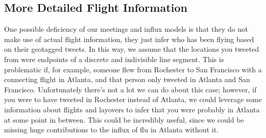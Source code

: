 \documentclass[11pt, letterpaper]{article}
\begin{document}
        \subsection{More Detailed Flight Information}
            One possible deficiency of our meetings and influx models is that they do not make use of actual flight information, they just infer who has been flying based on their geotagged tweets. In this way, we assume that the locations you tweeted from were endpoints of a discrete and indivisible line segment. This is problematic if, for example, someone flew from Rochester to San Francisco with a connecting flight in Atlanta, and that person only tweeted in Atlanta and San Francisco. Unfortunately there's not a lot we can do about this case; however, if you were to have tweeted in Rochester instead of Atlanta, we could leverage some information about flights and layovers to infer that you were probably in Atlanta at some point in between. This could be incredibly useful, since we could be missing huge contributions to the influx of flu in Atlanta without it.
        
    \newpage
    
    
\end{document}
